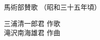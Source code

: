 \documentclass[10pt,b5j]{tarticle} %
\begin{document}
\begin{minipage}[c]{0.7\hsize} %
    \begin{center}
        {\LARGE
            馬術部賛歌 %
        }
        {\small 
            （昭和三十五年頃） %
        }
    \end{center}
\end{minipage}
\begin{minipage}[c]{0.3\hsize} %
    \begin{flushright} %
        三浦清一郎君 作歌\\滝沢南海雄君 作曲 %
    \end{flushright}
\end{minipage}
\end{document}
